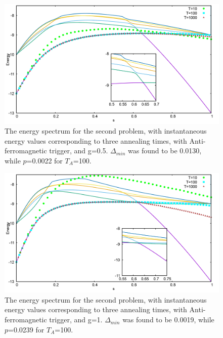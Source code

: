 \documentclass[../main.tex]{subfiles}
\begin{document}
\begin{figure}[H]
\centering 
\includegraphics[scale=0.3]{950_s12_A_g0.png}
\caption{The energy spectrum for the second problem, with instantaneous energy values corresponding to three annealing times, with Anti-ferromagnetic trigger, and g=0.5. $\Delta_{min}$ was found to be 0.0130, while $p$=0.0022 for $T_A$=100. }
\label{fig:a4}
\end{figure}
\begin{figure}[H]
\centering 
\includegraphics[scale=0.3]{950_s12_A_g1.png}
\caption{The energy spectrum for the second problem, with instantaneous energy values corresponding to three annealing times, with Anti-ferromagnetic trigger, and g=1. $\Delta_{min}$ was found to be 0.0019, while $p$=0.0239 for $T_A$=100. }
\label{fig:a5}
\end{figure}
\end{document}
